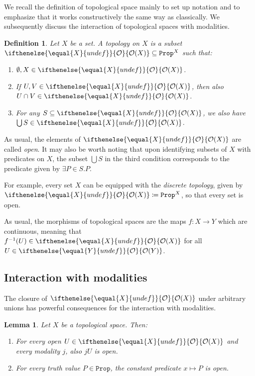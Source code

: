 \documentclass[reqno,11pt]{amsproc}
\theoremstyle{plain}
\newtheorem{lemma}[theorem]{Lemma}
\newtheorem{definition}[theorem]{Definition}
\theoremstyle{definition}
\newcommand{\Const}[1]{\mathtt{#1}}
\renewcommand{\to}[1][]{\xrightarrow{#1}}
\newcommand{\prop}{\Const{Prop}}
\newcommand{\Op}[1][undef]{\ifthenelse{\equal{#1}{undef}}{\mathcal{O}}{\mathcal{O}(#1)}}
\numberwithin{equation}{section}
\begin{document}
We recall the definition of topological space mainly to set up notation and to emphasize that it works constructively the same way as classically. We subsequently discuss the interaction of topological spaces with modalities.

\begin{definition}\label{def.internal_space}
	Let $X$ be a set. A \emph{topology} on $X$ is a subset $\Op[X] \subseteq \prop^X$ such that:
	\begin{enumerate}
		\item $\emptyset, X \in \Op[X]$.
		\item If $U,V \in \Op[X]$, then also $U \cap V \in \Op[X]$.
		\item For any $S \subseteq \Op[X]$, we also have $\bigcup S \in \Op[X]$.
	\end{enumerate}
\end{definition}

As usual, the elements of $\Op[X]$ are called \emph{open}. It may also be worth noting that upon identifying subsets of $X$ with predicates on $X$, the subset $\bigcup S$ in the third condition corresponds to the predicate given by $\exists P \in S . P$.

For example, every set $X$ can be equipped with the \emph{discrete topology}, given by $\Op[X] \coloneqq \prop^X$, so that every set is open.

As usual, the morphisms of topological spaces are the maps $f \colon X \to Y$ which are continuous, meaning that $f^{-1}(U) \in \Op[X]$ for all $U \in \Op[Y]$.

\subsection{Interaction with modalities}

The closure of $\Op[X]$ under arbitrary unions has powerful consequences for the interaction with modalities.

\begin{lemma}
	\label{props_open}
	Let $X$ be a topological space. Then:
	\begin{enumerate}
		\item For every open $U \in \Op[X]$ and every modality $j$, also $jU$ is open.
		\item For every truth value $P \in \prop$, the constant predicate $x \mapsto P$ is open.
	\end{enumerate}
\end{lemma}
\end{document}

